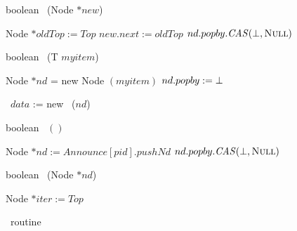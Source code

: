 \begin{figure*}
	
\begin{algorithm}[H]
	\caption{boolean \trypush\ (Node $*new$)}
	
	Node $*oldTop := Top$\;
	$new.next := oldTop$\;
	 {
		$nd.popby.\mbox{\textit{CAS}}(\mbox{$\bot$}, \mbox{\sc Null})$ \;
		\KwRet \True
	} 
	\KwRet \False
\end{algorithm}

\begin{algorithm}[H]
	\caption{boolean \push\ (T $myitem$)}
	
	Node $*nd$ = new Node $(myitem)$ \;
	$nd.popby := \mbox{$\bot$}$ \;
	
	\pushInfo\ $data$ := new \pushInfo\ ($nd$) \;
\end{algorithm}

\begin{algorithm}[H]
	\caption{boolean \recoverPush\ $()$}
	
	Node $*nd := Announce[pid].pushNd$ \;
	 {\KwRet \True}
	 {
		$nd.popby.\mbox{\textit{CAS}}(\mbox{$\bot$}, \mbox{\sc Null})$ \;
		\KwRet \True \;
	}
	\KwRet \fail \;
\end{algorithm}

\begin{algorithm}[H]
	\caption{boolean \search\ (Node $*nd$)}
	
	Node $*iter := Top$ \;
	\KwRet \False
\end{algorithm}

\caption{\push\ routine}
\end{figure*}




